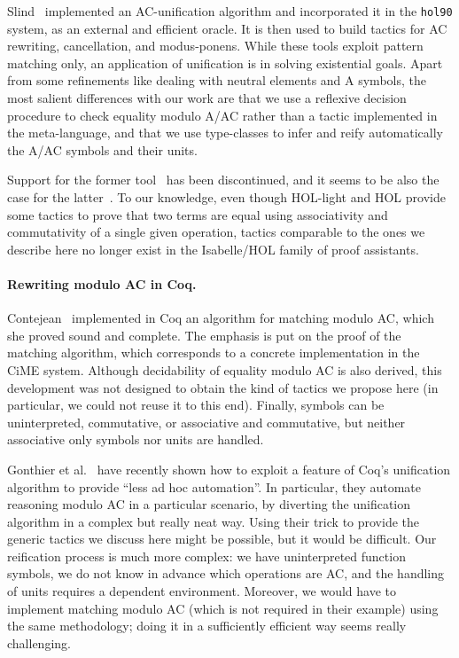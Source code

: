 \documentclass{llncs}
\begin{document}
Slind~\cite{slind} implemented an AC-unification algorithm and
incorporated it in the {\tt hol90} system, as an external and efficient
oracle. It is then used to build tactics for AC rewriting,
cancellation, and modus-ponens.
While these tools exploit pattern matching only, an application of
unification is in solving existential goals. 
Apart from some refinements like dealing with neutral elements and A
symbols, the most salient differences with our work are that we
use a reflexive decision procedure to check equality modulo A/AC
rather than a tactic implemented in the meta-language, and that we use
type-classes to infer and reify automatically the A/AC symbols and
their units.

Support for the former tool~\cite{nipkow-er} has been discontinued,
and it seems to be also the case for the latter~\cite{slind}. To our
knowledge, even though HOL-light and HOL provide some tactics to prove
that two terms are equal using associativity and commutativity of a
single given operation, tactics comparable to the ones we describe
here no longer exist in the Isabelle/HOL family of proof assistants.

\paragraph{Rewriting modulo AC in Coq.}

Contejean~\cite{contejean-04} implemented in Coq an algorithm for
matching modulo AC, which she proved sound and complete. The emphasis
is put on the proof of the matching algorithm, which corresponds to a
concrete implementation in the CiME system. Although decidability of
equality modulo AC is also derived, this development was not designed
to obtain the kind of tactics we propose here (in particular, we could
not reuse it to this end). Finally, symbols can be uninterpreted,
commutative, or associative and commutative, but neither associative
only symbols nor units are handled.

\smallskip

Gonthier et al.~\cite{gonthier:icfp11} have recently shown how to
exploit a feature of Coq's unification algorithm to provide ``less ad
hoc automation''. In particular, they automate reasoning modulo AC in
a particular scenario, by diverting the unification algorithm in a
complex but really neat way. Using their trick to provide the generic
tactics we discuss here might be possible, but it would be
difficult. Our reification process is much more complex: we have
uninterpreted function symbols, we do not know in advance which
operations are AC, and the handling of units requires a dependent
environment. Moreover, we would have to implement matching modulo AC
(which is not required in their example) using the same methodology;
doing it in a sufficiently efficient way seems really challenging.
\end{document}

